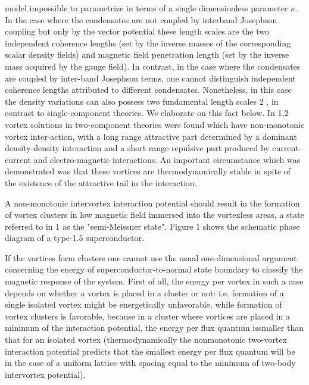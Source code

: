 model impossible to parametrize in terms of a single dimensionless parameter 
\( \kappa \). In the case where the condensates are not coupled by interband 
Josephson coupling but only by the vector potential these length scales are
the two independent coherence lengths (set by the inverse masses of the 
corresponding scalar density fields) and magnetic field penetration length 
(set by the inverse mass acquired by the gauge field). In contrast, in the 
case where the condensates are coupled by inter-band Josephson terms, one 
cannot distinguish independent coherence lengths attributed to different 
condensates. Nonetheless, in this case the density variations can also possess 
two fundamental length scales 2 , in contrast to single-component theories. 
We elaborate on this fact below. In 1,2 vortex solutions in two-component 
theories were found which have non-monotonic vortex inter-action, with a long 
range attractive part determined by a dominant density-density interaction and 
a short range repulsive part produced by current-current and electro-magnetic 
interactions. An important circumstance which was demonstrated was that these 
vortices are thermodynamically stable in spite of the existence of the 
attractive tail in the interaction.

A non-monotonic intervortex interaction potential should result in the 
formation of vortex clusters in low magnetic field immersed into the 
vortexless areas, a state referred to in 1 as the "semi-Meissner state". 
Figure 1 shows the schematic phase diagram of a type-1.5 superconductor.

If the vortices form clusters one cannot use the usual one-dimensional 
argument concerning the energy of superconductor-to-normal state boundary to 
classify the magnetic response of the system. First of all, the energy per 
vortex in such a case depends on whether a vortex is placed in a cluster or 
not: i.e. formation of a single isolated vortex might be energetically 
unfavorable, while formation of vortex clusters is favorable, because in a 
cluster where vortices are placed in a minimum of the interaction potential, 
the energy per flux quantum issmaller than that for an isolated vortex 
(thermodynamically the nonmonotonic two-vortex interaction potential predicts 
that the smallest energy per flux quantum will be in the case of a uniform 
lattice with spacing equal to the minimum of two-body intervortex potential).

